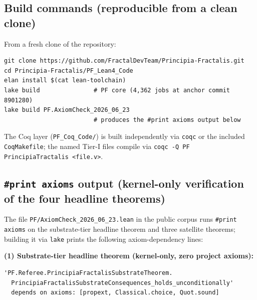 \documentclass[11pt,a4paper]{amsart}
\theoremstyle{plain}
\theoremstyle{definition}
\begin{document}
\subsection{Build commands (reproducible from a clean clone)}\label{subsec:repro-build}

From a fresh clone of the repository:

\begin{verbatim}
git clone https://github.com/FractalDevTeam/Principia-Fractalis.git
cd Principia-Fractalis/PF_Lean4_Code
elan install $(cat lean-toolchain)
lake build               # PF core (4,362 jobs at anchor commit 8901280)
lake build PF.AxiomCheck_2026_06_23
                         # produces the #print axioms output below
\end{verbatim}

The Coq layer (\texttt{PF\_Coq\_Code/}) is built independently via \texttt{coqc} or the included \texttt{CoqMakefile}; the named Tier-I files compile via \texttt{coqc -Q PF PrincipiaTractalis <file.v>}.

\subsection{\texttt{\#print axioms} output (kernel-only verification of the four headline theorems)}\label{subsec:repro-axioms}

The file \texttt{PF/AxiomCheck\_2026\_06\_23.lean} in the public corpus runs \texttt{\#print axioms} on the substrate-tier headline theorem and three satellite theorems; building it via \texttt{lake} prints the following axiom-dependency lines:

\smallskip
\textbf{(1) Substrate-tier headline theorem (kernel-only, zero project axioms):}
\begin{verbatim}
'PF.Referee.PrincipiaFractalisSubstrateTheorem.
  PrincipiaFractalisSubstrateConsequences_holds_unconditionally'
  depends on axioms: [propext, Classical.choice, Quot.sound]
\end{verbatim}
\end{document}
